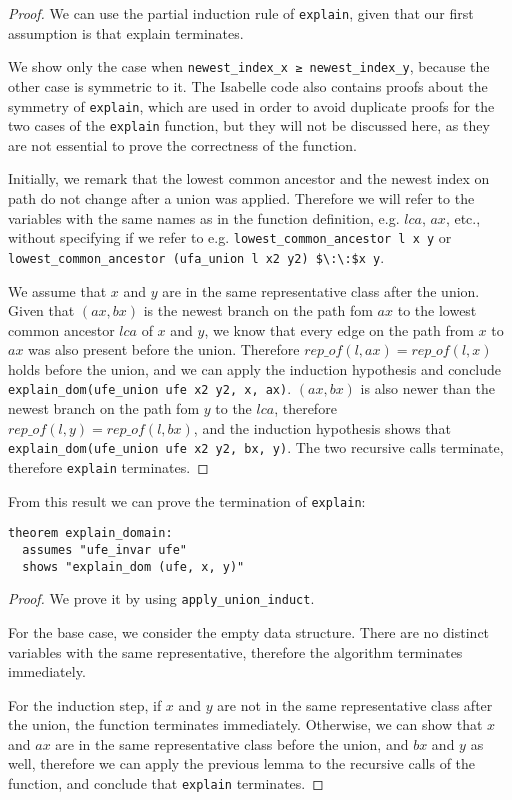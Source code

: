 \begin{proof}
We can use the partial induction rule of \lstinline|explain|, given that our first assumption is that explain terminates.

We show only the case when \lstinline|newest_index_x ≥ newest_index_y|, because the other case is symmetric to it. The Isabelle code also contains proofs about the symmetry of \lstinline{explain}, which are used in order to avoid duplicate proofs for the two cases of the \lstinline{explain} function, but they will not be discussed here, as they are not essential to prove the correctness of the function.

Initially, we remark that the lowest common ancestor and the newest index on path do not change after a union was applied. Therefore we will refer to the variables with the same names as in the function definition, e.g. $lca$, $ax$, etc., without specifying if we refer to e.g. \lstinline|lowest_common_ancestor l x y| or \lstinline|lowest_common_ancestor (ufa_union l x2 y2) $\:\:$x y|.

We assume that $x$ and $y$ are in the same representative class after the union. Given that $(ax, bx)$ is the newest branch on the path fom $ax$ to the lowest common ancestor $lca$ of $x$ and $y$, we know that every edge on the path from $x$ to $ax$ was also present before the union. Therefore $rep\_of(l, ax) = rep\_of(l, x)$ holds before the union, and we can apply the induction hypothesis and conclude \lstinline|explain_dom(ufe_union ufe x2 y2, x, ax)|. $(ax, bx)$ is also newer than the newest branch on the path fom $y$ to the $lca$, therefore $rep\_of(l, y) = rep\_of(l, bx)$, and the induction hypothesis shows that \lstinline|explain_dom(ufe_union ufe x2 y2, bx, y)|. The two recursive calls terminate, therefore \lstinline|explain| terminates.
\end{proof}

From this result we can prove the termination of \lstinline|explain|:

\begin{lstlisting}
theorem explain_domain:
  assumes "ufe_invar ufe"
  shows "explain_dom (ufe, x, y)"
\end{lstlisting}

\begin{proof}
We prove it by using \lstinline|apply_union_induct|.

For the base case, we consider the empty data structure. There are no distinct variables with the same representative, therefore the algorithm terminates immediately.

For the induction step, if $x$ and $y$ are not in the same representative class after the union, the function terminates immediately. Otherwise, we can show that $x$ and $ax$ are in the same representative class before the union, and $bx$ and $y$ as well, therefore we can apply the previous lemma to the recursive calls of the function, and conclude that \lstinline|explain| terminates.
\end{proof}

